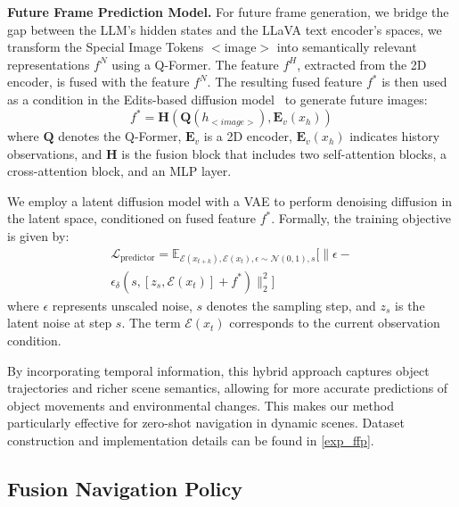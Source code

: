  \textbf{Future Frame Prediction Model.} For future frame generation, we bridge the gap between the LLM's hidden states and the LLaVA text encoder's spaces, we transform the Special Image Tokens $<$image$>$ into semantically relevant representations $f^N$ using a Q-Former. 
%
The feature $f^H$, extracted from the 2D encoder, is fused with the feature $f^N$. 
%
The resulting fused feature $f^*$ is then used as a condition in the Edits-based diffusion model~\cite{koh2024generating} to generate future images:
{
\vspace{-2mm}
\begin{equation}
f^*=\mathbf{H}(\mathbf{Q}\left(h_{<image>}\right), \mathbf{E}_{v}(x_{h}))
\end{equation}
}
%
where $\mathbf{Q}$ denotes the Q-Former, $\mathbf{E}_{v}$ is a 2D encoder, $\mathbf{E}_{v}(x_{h})$ indicates history observations, and $\mathbf{H}$ is the fusion block that includes two self-attention blocks, a cross-attention block, and an MLP layer.

We employ a latent diffusion model with a VAE to perform denoising diffusion in the latent space, conditioned on fused feature $f^*$. Formally, the training objective is given by:
{
\begin{equation}
\begin{split}
\mathcal{L}_{\mathrm{predictor}}=\mathbb{E}_{\mathcal{E}(x_{t+k}), \mathcal{E}(x_{t}), \epsilon \sim \mathcal{N}(0,1), s}[\| \epsilon \nonumber -\\\epsilon_\delta(s, [z_s, \mathcal{E}(x_{t})]+f^*) \|_2^2]
\label{eq:diffusion}
\end{split}
\tag{2}
\end{equation}
}
where $\epsilon$ represents unscaled noise, $s$ denotes the sampling step, and $z_{s}$ is the latent noise at step $s$. The term $\mathcal{E}(x_t)$ corresponds to the current observation condition. 

By incorporating temporal information, this hybrid approach captures object trajectories and richer scene semantics, allowing for more accurate predictions of object movements and environmental changes. This makes our method particularly effective for zero-shot navigation in dynamic scenes. Dataset construction and implementation details can be found in \ref{exp_ffp}.




\subsection{Fusion Navigation Policy}

